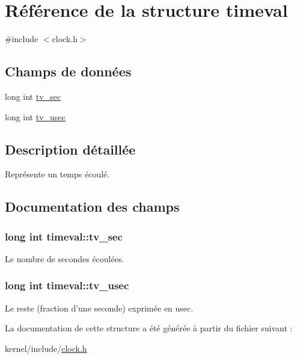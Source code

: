 \hypertarget{structtimeval}{\section{Référence de la structure timeval}
\label{structtimeval}
}


{\ttfamily \#include $<$clock.\-h$>$}

\subsection*{Champs de données}
\begin{DoxyCompactItemize}
\item 
long int \hyperlink{structtimeval_ab6fac84a084d017bb157f4681dafe8a3}{tv\-\_\-sec}
\item 
long int \hyperlink{structtimeval_a6f90a236deb00a89fe3dd8023d525d9c}{tv\-\_\-usec}
\end{DoxyCompactItemize}


\subsection{Description détaillée}
Représente un temps écoulé. 

\subsection{Documentation des champs}
\hypertarget{structtimeval_ab6fac84a084d017bb157f4681dafe8a3}{
\subsubsection[{tv\-\_\-sec}]{\setlength{\rightskip}{0pt plus 5cm}long int timeval\-::tv\-\_\-sec}}\label{structtimeval_ab6fac84a084d017bb157f4681dafe8a3}
Le nombre de secondes écoulées. \hypertarget{structtimeval_a6f90a236deb00a89fe3dd8023d525d9c}{
\subsubsection[{tv\-\_\-usec}]{\setlength{\rightskip}{0pt plus 5cm}long int timeval\-::tv\-\_\-usec}}\label{structtimeval_a6f90a236deb00a89fe3dd8023d525d9c}
Le reste (fraction d'une seconde) exprimée en usec. 

La documentation de cette structure a été générée à partir du fichier suivant \-:\begin{DoxyCompactItemize}
\item 
kernel/include/\hyperlink{clock_8h}{clock.\-h}\end{DoxyCompactItemize}
